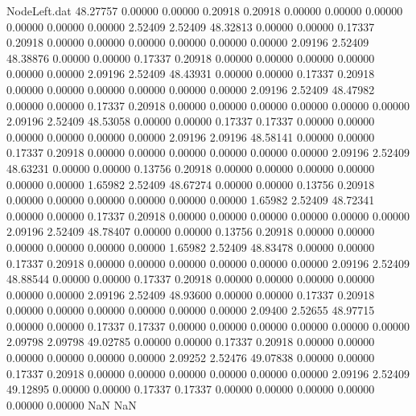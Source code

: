 \begin{filecontents}{NodeLeft.dat}
  48.27757    0.00000    0.00000     0.20918    0.20918    0.00000    0.00000    0.00000    0.00000    0.00000    0.00000    2.52409    2.52409
  48.32813    0.00000    0.00000     0.17337    0.20918    0.00000    0.00000    0.00000    0.00000    0.00000    0.00000    2.09196    2.52409
  48.38876    0.00000    0.00000     0.17337    0.20918    0.00000    0.00000    0.00000    0.00000    0.00000    0.00000    2.09196    2.52409
  48.43931    0.00000    0.00000     0.17337    0.20918    0.00000    0.00000    0.00000    0.00000    0.00000    0.00000    2.09196    2.52409
  48.47982    0.00000    0.00000     0.17337    0.20918    0.00000    0.00000    0.00000    0.00000    0.00000    0.00000    2.09196    2.52409
  48.53058    0.00000    0.00000     0.17337    0.17337    0.00000    0.00000    0.00000    0.00000    0.00000    0.00000    2.09196    2.09196
  48.58141    0.00000    0.00000     0.17337    0.20918    0.00000    0.00000    0.00000    0.00000    0.00000    0.00000    2.09196    2.52409
  48.63231    0.00000    0.00000     0.13756    0.20918    0.00000    0.00000    0.00000    0.00000    0.00000    0.00000    1.65982    2.52409
  48.67274    0.00000    0.00000     0.13756    0.20918    0.00000    0.00000    0.00000    0.00000    0.00000    0.00000    1.65982    2.52409
  48.72341    0.00000    0.00000     0.17337    0.20918    0.00000    0.00000    0.00000    0.00000    0.00000    0.00000    2.09196    2.52409
  48.78407    0.00000    0.00000     0.13756    0.20918    0.00000    0.00000    0.00000    0.00000    0.00000    0.00000    1.65982    2.52409
  48.83478    0.00000    0.00000     0.17337    0.20918    0.00000    0.00000    0.00000    0.00000    0.00000    0.00000    2.09196    2.52409
  48.88544    0.00000    0.00000     0.17337    0.20918    0.00000    0.00000    0.00000    0.00000    0.00000    0.00000    2.09196    2.52409
  48.93600    0.00000    0.00000     0.17337    0.20918    0.00000    0.00000    0.00000    0.00000    0.00000    0.00000    2.09400    2.52655
  48.97715    0.00000    0.00000     0.17337    0.17337    0.00000    0.00000    0.00000    0.00000    0.00000    0.00000    2.09798    2.09798
  49.02785    0.00000    0.00000     0.17337    0.20918    0.00000    0.00000    0.00000    0.00000    0.00000    0.00000    2.09252    2.52476
  49.07838    0.00000    0.00000     0.17337    0.20918    0.00000    0.00000    0.00000    0.00000    0.00000    0.00000    2.09196    2.52409
  49.12895    0.00000    0.00000     0.17337    0.17337    0.00000    0.00000    0.00000    0.00000    0.00000    0.00000        NaN        NaN
\end{filecontents}
